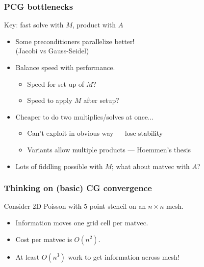\documentclass{beamer}
\begin{document}
\begin{frame}[fragile]
  \frametitle{PCG bottlenecks}

  Key: fast solve with $M$, product with $A$
  \begin{itemize}
  \item Some preconditioners parallelize better! \\
    (Jacobi vs Gauss-Seidel)
  \item Balance speed with performance.
    \begin{itemize}
    \item Speed for set up of $M$?
    \item Speed to apply $M$ after setup?
    \end{itemize}
  \item Cheaper to do two multiplies/solves at once...
    \begin{itemize}
    \item Can't exploit in obvious way --- lose stability
    \item Variants allow multiple products --- Hoemmen's thesis
    \end{itemize}
  \item Lots of fiddling possible with $M$; what about
    matvec with $A$?
  \end{itemize}

\end{frame}


\begin{frame}
  \frametitle{Thinking on (basic) CG convergence}

  \begin{center}
    
  \end{center}
  Consider 2D Poisson with 5-point stencil on an $n \times n$ mesh.
  \begin{itemize}
  \item Information moves one grid cell per matvec.
  \item Cost per matvec is $O(n^2)$.
  \item At least $O(n^3)$ work to get information across mesh!
  \end{itemize}
\end{frame}
\end{document}
